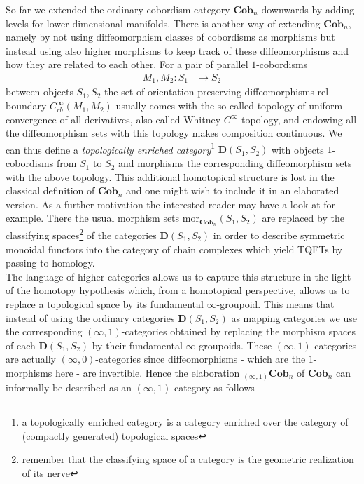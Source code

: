 So far we extended the ordinary cobordism category $\mathbf{Cob}_{n}$ downwards by adding levels for lower dimensional manifolds. There is another way of extending $\mathbf{Cob}_{n}$, namely by not using diffeomorphism classes of cobordisms as morphisms but instead using also higher morphisms to keep track of these diffeomorphisms and how they are related to each other. For a pair of parallel $1$-cobordisms
\begin{align*}
  M_{1}
  ,
  M_{2}
  \colon
  S_{1}
  &\to
  S_{2}
\end{align*}
between objects $S_{1},S_{2}$ the set of orientation-preserving diffeomorphisms rel boundary $C_{rb}^{\infty}(M_{1},M_{2})$ usually comes with the so-called topology of uniform convergence of all derivatives, also called Whitney $C^{\infty}$ topology, and endowing all the diffeomorphism sets with this topology makes composition continuous. We can thus define a \textit{topologically enriched category}\footnote{a topologically enriched category is a category enriched over the category of (compactly generated) topological spaces} $\mathbf{D}(S_{1},S_{2})$ with objects $1$-cobordisms from $S_{1}$ to $S_{2}$ and morphisms the corresponding diffeomorphism sets with the above topology. This additional homotopical structure is lost in the classical definition of $\mathbf{Cob}_{n}$ and one might wish to include it in an elaborated version. As a further motivation the interested reader may have a look at \cite{dfcdc48c} for example. There the usual morphism sets $\mathrm{mor}_{\mathbf{Cob}_{n}}(S_{1},S_{2})$ are replaced by the classifying spaces\footnote{remember that the classifying space of a category is the geometric realization of its nerve} of the categories $\mathbf{D}(S_{1},S_{2})$ in order to describe symmetric monoidal functors into the category of chain complexes which yield TQFTs by passing to homology.
\\
The language of higher categories allows us to capture this structure in the light of the homotopy hypothesis which, from a homotopical perspective, allows us to replace a topological space by its fundamental $\infty$-groupoid. This means that instead of using the ordinary categories $\mathbf{D}(S_{1},S_{2})$ as mapping categories we use the corresponding $(\infty,1)$-categories obtained by replacing the morphism spaces of each $\mathbf{D}(S_{1},S_{2})$ by their fundamental $\infty$-groupoids. These $(\infty,1)$-categories are actually $(\infty,0)$-categories since diffeomorphisms - which are the $1$-morphisms here - are invertible. Hence the elaboration ${_{(\infty,1)}}\mathbf{Cob}_{n}$ of $\mathbf{Cob}_{n}$ can informally be described as an $(\infty,1)$-category as follows
